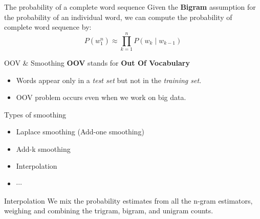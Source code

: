 \documentclass{beamer}
\begin{document}

\begin{frame}{The probability of a complete word sequence}
    Given the \textbf{Bigram} assumption for the probability of an individual word, we can compute the probability of complete word sequence by:
    $$P(w_1^n) \approx \prod_{k=1}^nP(w_k\mid w_{k-1})$$

    \begin{block}{}
    \end{block}

\end{frame}


\begin{frame}{OOV \& Smoothing}
    \textbf{OOV} stands for \textbf{Out Of Vocabulary}\\
    \begin{itemize}
        \item Words appear only in a \textit{test set} but not in the \textit{training set}.
        \item OOV problem occurs even when we work on big data.
    \end{itemize}
\end{frame}

\begin{frame}{Types of smoothing}
    \begin{itemize}
        \item Laplace smoothing (Add-one smoothing)
        \item Add-k smoothing
        \item Interpolation
        \item $\cdots$
    \end{itemize}
    \begin{block}{Interpolation}
        We mix the probability estimates from all the n-gram estimators, weighing and combining the trigram, bigram, and unigram counts.
    \end{block}
\end{frame}
\end{document}

